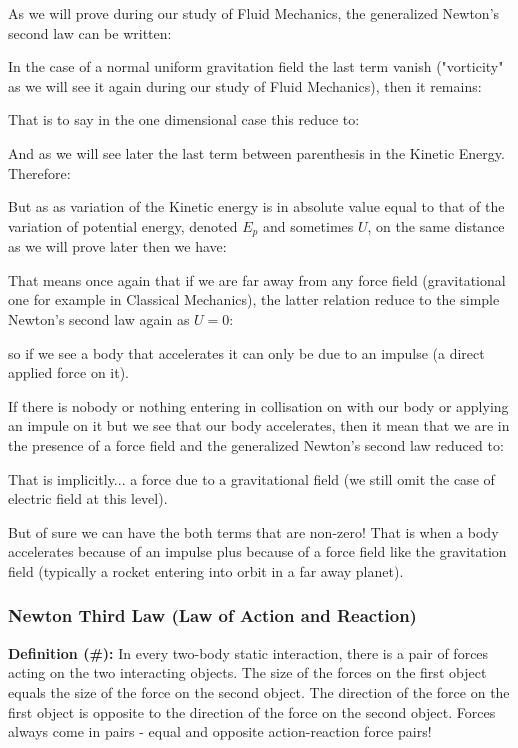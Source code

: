 	
	As we will prove during our study of Fluid Mechanics, the generalized Newton's second law can be written:
	
	In the case of a normal uniform gravitation field the last term vanish ("vorticity" as we will see it again during our study of Fluid Mechanics), then it remains:
	
	That is to say in the one dimensional case this reduce to:
	
	And as we will see later the last term between parenthesis in the Kinetic Energy. Therefore:
	
	 But as as variation of the Kinetic energy is in absolute value equal to that of the variation of potential energy, denoted $E_p$ and sometimes $U$, on the same distance as we will prove later  then we have:
	 
	That means once again that if we are far away from any force field (gravitational one for example in Classical Mechanics), the latter relation reduce to the simple Newton's second law again as $U=0$:
	
	so if we see a body that accelerates it can only be due to an impulse (a direct applied force on it). 

	If there is nobody or nothing entering in collisation on with our body or applying an impule on it but we see that our body accelerates, then it mean that we are in the presence of a force field and the generalized Newton's second law reduced to:
	
	That is implicitly... a force due to a gravitational field (we still omit the case of electric field at this level).

	But of sure we can have the both terms that are non-zero! That is when a body accelerates because of an impulse plus because of a force field like the gravitation field (typically a rocket entering into orbit in a far away planet).
	
	
	\subsubsection{Newton Third Law (Law of Action and Reaction)}
	\textbf{Definition (\#\mydef):}  In every two-body static interaction, there is a pair of forces acting on the two interacting objects. The size of the forces on the first object equals the size of the force on the second object. The direction of the force on the first object is opposite to the direction of the force on the second object. Forces always come in pairs - equal and opposite action-reaction force pairs!
	
